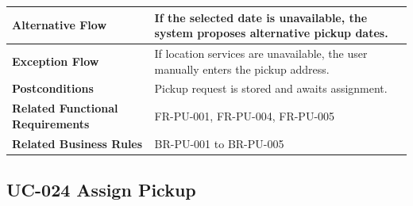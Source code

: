 \begin{longtable}{|p{4cm}|p{10cm}|}
\textbf{Alternative Flow} &
If the selected date is unavailable, the system proposes alternative
pickup dates.\\
\hline

\textbf{Exception Flow} &
If location services are unavailable, the user manually enters the
pickup address.\\
\hline

\textbf{Postconditions} &
Pickup request is stored and awaits assignment.\\
\hline

\textbf{Related Functional Requirements} &
FR-PU-001, FR-PU-004, FR-PU-005 \\
\hline

\textbf{Related Business Rules} &
BR-PU-001 to BR-PU-005 \\
\hline

\end{longtable}

\subsection{UC-024 Assign Pickup}

